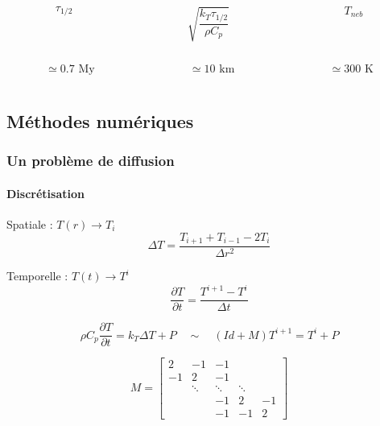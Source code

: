 \documentclass{beamer}
\begin{document}
\begin{frame}
\vspace{0.5cm}

\begin{columns}
    \begin{column}{4cm}
      $$\tau_{1/2}$$
	\end{column}

	\begin{column}{4cm}
      $$\sqrt{\dfrac{k_T\tau_{1/2}}{\rho C_p}}$$
	\end{column}
	
	\begin{column}{4cm}
      $$T_{neb}$$     
	\end{column}
\end{columns}

\vspace{0.5cm}

\begin{columns}
    \begin{column}{4cm}
      $$\simeq 0.7 \text{ My}$$
	\end{column}

	\begin{column}{4cm}
      $$\simeq 10\text{ km}$$
	\end{column}
	
	\begin{column}{4cm}
      $$\simeq 300 \text{ K}$$       
	\end{column}
\end{columns}
	
\end{frame}


\subsection{Méthodes numériques}

\begin{frame}
	\frametitle{Un problème de diffusion}
	\framesubtitle{Discrétisation}
	

Spatiale : $T(r) \rightarrow T_i$ 
$$\Delta T = \frac{T_{i+1} + T_{i-1} - 2T_{i}}{\Delta r ^2} $$ 


Temporelle : $T(t) \rightarrow T^i$ 
$$\dfrac{\partial T}{\partial t} = \frac{T^{i+1}-T^{i}}{\Delta t} $$


$$\rho C_p \dfrac{\partial T}{\partial t}= k_{T} \Delta T  + P
\quad \sim \quad (Id + M) T^{i+1}=T^i + P$$


$$
M =
\begin{bmatrix}
    2      & -1     & -1        &      &     \\
    -1      &  2     & -1        &     &              \\
     & \ddots & \ddots    & \ddots &       \\
 &     &  -1      &  2     & -1                      \\
     &    &    -1      & -1     & 2          
\end{bmatrix}
$$

\end{frame}
\end{document}
